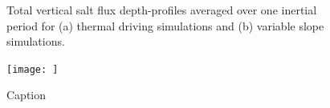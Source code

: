 \documentclass[draft,jgrga]{agutexSI2019}
\begin{document}
\begin{figure}[]
\begin{minipage}{0.5\textwidth}
    \end{minipage}
    \caption{Total vertical salt flux depth-profiles averaged over one inertial period for (a) thermal driving simulations and (b) variable slope simulations.}
    \label{fig:saltflux}
\end{figure}%

\begin{figure}
    \centering
    \texttt{[image: ]}
    \caption{Caption}
    \label{fig:my_label}
\end{figure}%
%
%
%
%
%
%
%
%
%
%
%
\end{document}
